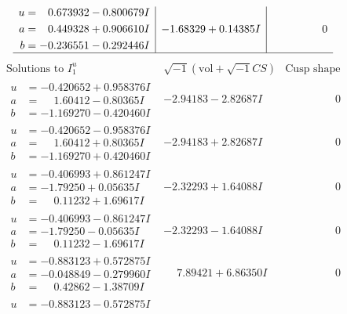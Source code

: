 \documentclass[1p]{elsarticle_modified}
\theoremstyle{definition}
\newcommand{\I}{\sqrt{-1}}
\begin{document}
$$\begin{array}{c|c|c}
\begin{aligned}
u &= \phantom{-}0.673932 - 0.800679 I \\
a &= \phantom{-}0.449328 + 0.906610 I \\
b &= -0.236551 - 0.292446 I\end{aligned}
 & -1.68329 + 0.14385 I & \phantom{-0.000000 } 0\\
 \hline 
 \end{array}$$\newpage$$\begin{array}{c|c|c}  
\text{Solutions to }I^u_{1}& \I (\text{vol} + \sqrt{-1}CS) & \text{Cusp shape}\\
 \hline 
\begin{aligned}
u &= -0.420652 + 0.958376 I \\
a &= \phantom{-}1.60412 - 0.80365 I \\
b &= -1.169270 - 0.420460 I\end{aligned}
 & -2.94183 - 2.82687 I & \phantom{-0.000000 } 0 \\ \hline\begin{aligned}
u &= -0.420652 - 0.958376 I \\
a &= \phantom{-}1.60412 + 0.80365 I \\
b &= -1.169270 + 0.420460 I\end{aligned}
 & -2.94183 + 2.82687 I & \phantom{-0.000000 } 0 \\ \hline\begin{aligned}
u &= -0.406993 + 0.861247 I \\
a &= -1.79250 + 0.05635 I \\
b &= \phantom{-}0.11232 + 1.69617 I\end{aligned}
 & -2.32293 + 1.64088 I & \phantom{-0.000000 } 0 \\ \hline\begin{aligned}
u &= -0.406993 - 0.861247 I \\
a &= -1.79250 - 0.05635 I \\
b &= \phantom{-}0.11232 - 1.69617 I\end{aligned}
 & -2.32293 - 1.64088 I & \phantom{-0.000000 } 0 \\ \hline\begin{aligned}
u &= -0.883123 + 0.572875 I \\
a &= -0.048849 - 0.279960 I \\
b &= \phantom{-}0.42862 - 1.38709 I\end{aligned}
 & \phantom{-}7.89421 + 6.86350 I & \phantom{-0.000000 } 0 \\ \hline\begin{aligned}
u &= -0.883123 - 0.572875 I \\

\end{aligned}
\end{array}$$
\end{document}
